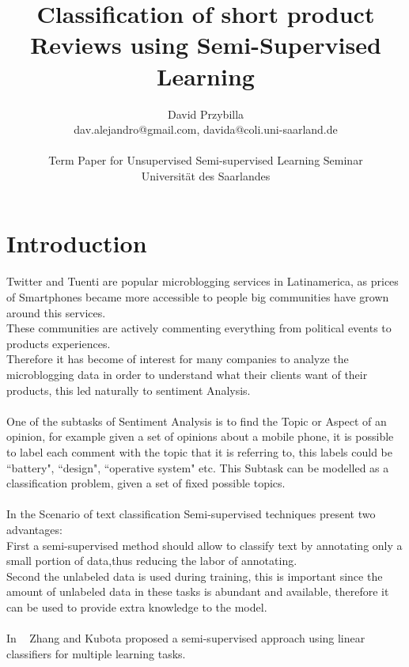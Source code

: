 \documentclass[4pt,a4paper,twocolumn]{article}
\author{David Przybilla\\dav.alejandro@gmail.com, davida@coli.uni-saarland.de\\ \\ Term Paper for Unsupervised Semi-supervised
Learning Seminar\\ Universit\"{a}t des Saarlandes}
\title{Classification of short product Reviews using Semi-Supervised Learning}
\begin{document}
\twocolumn[
	 \begin{@twocolumnfalse}
    \maketitle
   \begin{abstract}
      ...
    \end{abstract}
  \end{@twocolumnfalse}
  ]




\section{Introduction}
Twitter and Tuenti are popular microblogging services in Latinamerica,
as prices of Smartphones became more accessible to people big communities
have grown around this services.\\
These communities are actively commenting everything from political events to products experiences.\\
Therefore it has become of interest for many companies to analyze the microblogging data in order to understand
what their clients want of their products, this led naturally to sentiment Analysis.\\ 
\\
One of the subtasks of Sentiment Analysis is to find the Topic or Aspect of an opinion,
for example given a set of opinions about a mobile phone, it is possible to label each comment
with the topic that it is referring to, this labels could be ``battery", ``design", ``operative system" etc.
This Subtask can be modelled as a classification problem, given a set of fixed possible topics.\\
\\
In the Scenario of text classification Semi-supervised techniques present two advantages:\\
First a semi-supervised method should allow to classify text by annotating only a small portion of data,thus reducing the labor of annotating.\\
Second the unlabeled data is used during training, this is important since the amount of unlabeled data in these tasks is abundant and available, therefore it can be used to provide extra knowledge to the model.\\
\\
In ~\cite{Ando:2005:FLP:1046920.1194905} Zhang and Kubota proposed a semi-supervised approach using linear classifiers for multiple learning tasks.\\
\end{document}
